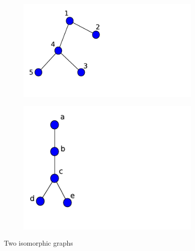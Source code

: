\documentclass[10pt,a4paper]{article}
\begin{document}
     	\begin{figure}[H]
     	\centering
     	\begin{subfigure}[b]{0.35\textwidth}
     		\includegraphics[width=\textwidth]{images/graph-isomorphism1.pdf}
     		\caption{}
     		\label{isomorphic1}
     	\end{subfigure}
     	\begin{subfigure}[b]{0.35\textwidth}
     		\includegraphics[width=\textwidth]{images/graph-isomorphism2.pdf}
     		\caption{}
     		\label{isomorphic2}
     	\end{subfigure} 
     	\caption{Two isomorphic graphs} 
     	\label{isomorphism}
     \end{figure}
 
\end{document}
